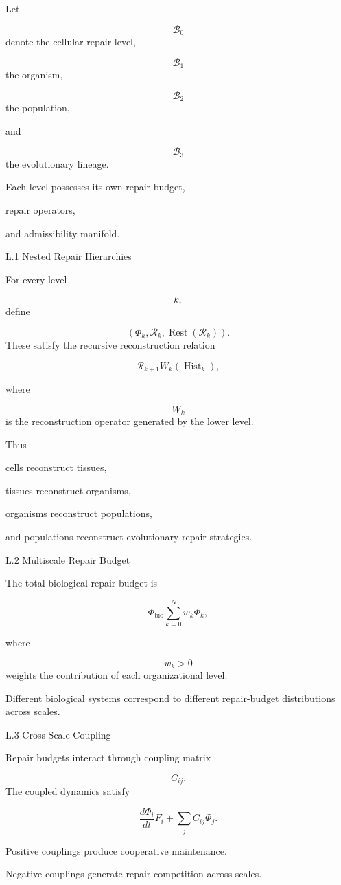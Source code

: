 \documentclass[12pt,oneside]{article}
\theoremstyle{plain}
\theoremstyle{definition}
\theoremstyle{remark}
\DeclareMathOperator{\Rest}{Rest}
\DeclareMathOperator{\Hist}{Hist}
\begin{document}
Let

\[
\mathcal B_0
\]
denote the cellular repair level,

\[
\mathcal B_1
\]
the organism,

\[
\mathcal B_2
\]
the population,

and

\[
\mathcal B_3
\]
the evolutionary lineage.

Each level possesses its own repair budget,

repair operators,

and admissibility manifold.


L.1 Nested Repair Hierarchies

For every level

\[
k,
\]
define

\[
(\Phi_k,\mathcal R_k,\Rest(\mathcal R_k)).
\]
These satisfy the recursive reconstruction relation

\[
\mathcal R_{k+1}
W_k(\Hist_k),
\]

where

\[
W_k
\]
is the reconstruction operator generated by the lower level.

Thus

cells reconstruct tissues,

tissues reconstruct organisms,

organisms reconstruct populations,

and populations reconstruct evolutionary repair strategies.


L.2 Multiscale Repair Budget

The total biological repair budget is

\[
\Phi_{\mathrm{bio}}
\sum_{k=0}^{N}
w_k
\Phi_k,
\]

where

\[
w_k>0
\]
weights the contribution of each organizational level.

Different biological systems correspond to different repair-budget distributions across scales.


L.3 Cross-Scale Coupling

Repair budgets interact through coupling matrix

\[
C_{ij}.
\]
The coupled dynamics satisfy

\[
\frac{d\Phi_i}{dt}
F_i
+
\sum_j
C_{ij}
\Phi_j.
\]

Positive couplings produce cooperative maintenance.

Negative couplings generate repair competition across scales.
\end{document}
